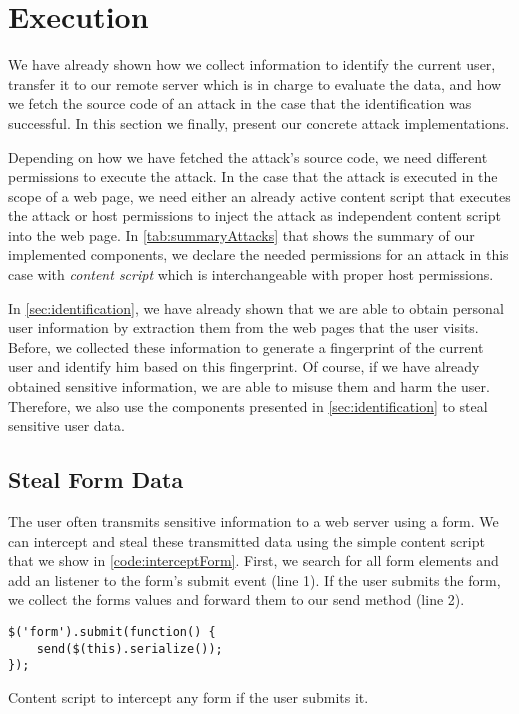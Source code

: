 	


\clearpage
\section{Execution}
\label{sec:execution}
	
	We have already shown how we collect information to identify the current user, transfer it to our remote server which is in charge to evaluate the data, and how we fetch the source code of an attack in the case that the identification was successful. In this section we finally, present our concrete attack implementations.
	
	Depending on how we have fetched the attack's source code, we need different permissions to execute the attack. In the case that the attack is executed in the scope of a web page, we need either an already active content script that executes the attack or host permissions to inject the attack as independent content script into the web page. In \autoref{tab:summaryAttacks} that shows the summary of our implemented components, we declare the needed permissions for an attack in this case with \textit{content script} which is interchangeable with proper host permissions.

	In \autoref{sec:identification}, we have already shown that we are able to obtain personal user information by extraction them from the web pages that the user visits. Before, we collected these information to generate a fingerprint of the current user and identify him based on this fingerprint. Of course, if we have already obtained sensitive information, we are able to misuse them and harm the user. Therefore, we also use the components presented in \autoref{sec:identification} to steal sensitive user data.

\subsection{Steal Form Data}

	The user often transmits sensitive information to a web server using a form. We can intercept and steal these transmitted data using the simple content script that we show in \autoref{code:interceptForm}. First, we search for all form elements and add an listener to the form's submit event (line 1). If the user submits the form, we collect the forms values and forward them to our send method (line 2).
	
	\begin{code}
		\begin{lstlisting}
$('form').submit(function() {
	send($(this).serialize());
});
		\end{lstlisting}
		\caption{Content script to intercept any form if the user submits it.}
		\label{code:interceptForm}
	\end{code}
	
